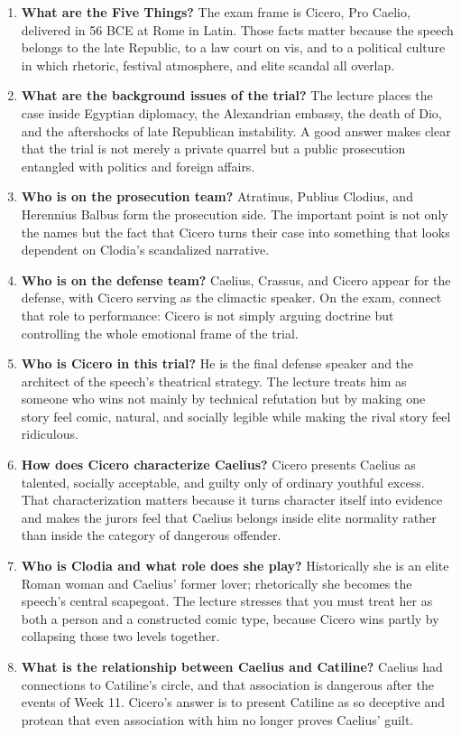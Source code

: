 \documentclass[11pt]{article}
\begin{document}
\begin{enumerate}
\item \textbf{What are the Five Things?} The exam frame is Cicero, Pro Caelio, delivered in 56 BCE at Rome in Latin. Those facts matter because the speech belongs to the late Republic, to a law court on vis, and to a political culture in which rhetoric, festival atmosphere, and elite scandal all overlap.
\item \textbf{What are the background issues of the trial?} The lecture places the case inside Egyptian diplomacy, the Alexandrian embassy, the death of Dio, and the aftershocks of late Republican instability. A good answer makes clear that the trial is not merely a private quarrel but a public prosecution entangled with politics and foreign affairs.
\item \textbf{Who is on the prosecution team?} Atratinus, Publius Clodius, and Herennius Balbus form the prosecution side. The important point is not only the names but the fact that Cicero turns their case into something that looks dependent on Clodia's scandalized narrative.
\item \textbf{Who is on the defense team?} Caelius, Crassus, and Cicero appear for the defense, with Cicero serving as the climactic speaker. On the exam, connect that role to performance: Cicero is not simply arguing doctrine but controlling the whole emotional frame of the trial.
\item \textbf{Who is Cicero in this trial?} He is the final defense speaker and the architect of the speech's theatrical strategy. The lecture treats him as someone who wins not mainly by technical refutation but by making one story feel comic, natural, and socially legible while making the rival story feel ridiculous.
\item \textbf{How does Cicero characterize Caelius?} Cicero presents Caelius as talented, socially acceptable, and guilty only of ordinary youthful excess. That characterization matters because it turns character itself into evidence and makes the jurors feel that Caelius belongs inside elite normality rather than inside the category of dangerous offender.
\item \textbf{Who is Clodia and what role does she play?} Historically she is an elite Roman woman and Caelius' former lover; rhetorically she becomes the speech's central scapegoat. The lecture stresses that you must treat her as both a person and a constructed comic type, because Cicero wins partly by collapsing those two levels together.
\item \textbf{What is the relationship between Caelius and Catiline?} Caelius had connections to Catiline's circle, and that association is dangerous after the events of Week 11. Cicero's answer is to present Catiline as so deceptive and protean that even association with him no longer proves Caelius' guilt.

\end{enumerate}
\end{document}

